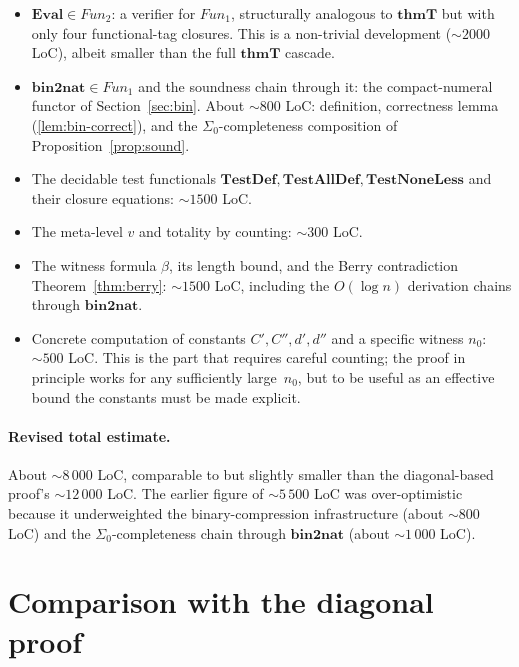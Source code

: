 \documentclass[11pt]{article}
\theoremstyle{plain}
\theoremstyle{definition}
\theoremstyle{remark}
\newcommand{\Fun}{\mathit{Fun}}
\newcommand{\Eval}{\mathbf{Eval}}
\newcommand{\bnt}{\mathbf{bin2nat}}
\begin{document}
\begin{itemize}
\item $\Eval \in \Fun_2$: a verifier for $\Fun_1$, structurally
analogous to $\mathbf{thmT}$ but with only four functional-tag
closures.  This is a non-trivial development ($\sim 2000$ LoC), albeit
smaller than the full $\mathbf{thmT}$ cascade.

\item $\bnt \in \Fun_1$ and the soundness chain through it: the
compact-numeral functor of Section~\ref{sec:bin}.  About $\sim 800$
LoC: definition, correctness lemma (\ref{lem:bin-correct}), and the
$\Sigma_0$-completeness composition of Proposition~\ref{prop:sound}.

\item The decidable test functionals $\mathbf{TestDef},
\mathbf{TestAllDef}, \mathbf{TestNoneLess}$ and their closure
equations: $\sim 1500$ LoC.

\item The meta-level $v$ and totality by counting: $\sim 300$ LoC.

\item The witness formula $\beta$, its length bound, and the Berry
contradiction Theorem~\ref{thm:berry}: $\sim 1500$ LoC, including the
$O(\log n)$ derivation chains through $\bnt$.

\item Concrete computation of constants $C', C'', d', d''$ and a
specific witness $n_0$: $\sim 500$ LoC.  This is the part that requires
careful counting; the proof in principle works for any sufficiently
large~$n_0$, but to be useful as an effective bound the constants
must be made explicit.
\end{itemize}

\paragraph{Revised total estimate.}  About $\sim 8\,000$ LoC, comparable
to but slightly smaller than the diagonal-based proof's
$\sim 12\,000$ LoC.  The earlier figure of $\sim 5\,500$ LoC was over-optimistic
because it underweighted the binary-compression infrastructure (about
$\sim 800$ LoC) and the $\Sigma_0$-completeness chain through $\bnt$
(about $\sim 1\,000$ LoC).

\section{Comparison with the diagonal proof}
\end{document}
